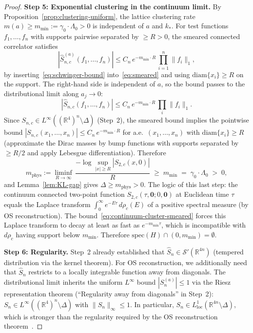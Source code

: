 \documentclass[11pt]{article}
\theoremstyle{definition}
\newcommand{\R}{\mathbb{R}}
\begin{document}
\begin{proof}
\textbf{Step 5: Exponential clustering in the continuum limit.}
By Proposition~\ref{prop:clustering-uniform}, the lattice clustering
rate $m(a)\ge m_{\min}:=\gamma_0\cdot\Lambda_0>0$ is independent
of $a$ and $k_*$.  For test functions $f_1,\ldots,f_n$ with
supports pairwise separated by $\ge R>0$, the smeared connected
correlator satisfies
\begin{equation}\label{eq:smeared-cluster}
|\hat S_{n,c}^{(a)}(f_1,\ldots,f_n)|
\le C_n\,e^{-m_{\min}\cdot R}\,
\prod_{i=1}^n\|f_i\|_1,
\end{equation}
by inserting~\eqref{eq:schwinger-bound} into~\eqref{eq:smeared}
and using $\mathrm{diam}\{x_i\}\ge R$ on the support.
The right-hand side is independent of $a$, so the
bound passes to the distributional limit along $a_j\to 0$:
\begin{equation}\label{eq:continuum-cluster-smeared}
|\hat S_{n,c}(f_1,\ldots,f_n)|
\le C_n\,e^{-m_{\min}\cdot R}\,
\prod_i\|f_i\|_1.
\end{equation}
Since $S_{n,c}\in L^\infty((\R^4)^n\setminus\Delta)$ (Step~2),
the smeared bound implies the pointwise bound
$|S_{n,c}(x_1,\ldots,x_n)|\le C_n\,e^{-m_{\min}\cdot R}$
for a.e.\ $(x_1,\ldots,x_n)$ with $\mathrm{diam}\{x_i\}\ge R$
(approximate the Dirac masses by bump functions with supports
separated by $\ge R/2$ and apply Lebesgue differentiation).
Therefore
\begin{equation}\label{eq:m-phys-final}
m_{\mathrm{phys}}
:=\liminf_{R\to\infty}\,
\frac{-\log\sup_{|x|\ge R}|S_{2,c}(x,0)|}{R}
\;\ge\; m_{\min}\;=\;\gamma_0\cdot\Lambda_0\;>\;0,
\end{equation}
and Lemma~\ref{lem:KL-gap} gives $\Delta\ge m_{\mathrm{phys}}>0$.
The logic of this last step: the continuum connected two-point
function $S_{2,c}(\tau,\mathbf{0};0,\mathbf{0})$ at Euclidean
time $\tau$ equals the Laplace transform
$\int_0^\infty e^{-E\tau}\,d\rho_c(E)$ of a positive spectral
measure (by OS reconstruction).  The
bound~\eqref{eq:continuum-cluster-smeared} forces this
Laplace transform to decay at least as fast as
$e^{-m_{\min}\tau}$, which is incompatible with $d\rho_c$
having support below $m_{\min}$.  Therefore
$\mathrm{spec}(H)\cap(0,m_{\min})=\emptyset$.

\textbf{Step 6: Regularity.}
Step~2 already established that $\hat S_n\in\mathcal{S}'(\R^{4n})$
(tempered distribution via the kernel theorem).
For OS reconstruction, we additionally need that $\hat S_n$
restricts to a locally integrable function away from diagonals.
The distributional limit inherits the uniform $L^\infty$ bound
$|S_n^{(a)}|\le 1$ via the Riesz representation theorem
(``Regularity away from diagonals'' in Step~2):
$S_n\in L^\infty((\R^4)^n\setminus\Delta)$ with
$\|S_n\|_\infty\le 1$.
In particular, $S_n\in L^1_{\mathrm{loc}}(\R^{4n}\setminus\Delta)$,
which is stronger than the regularity required by the OS
reconstruction theorem~\cite{OS73}.
\end{proof}
\end{document}
